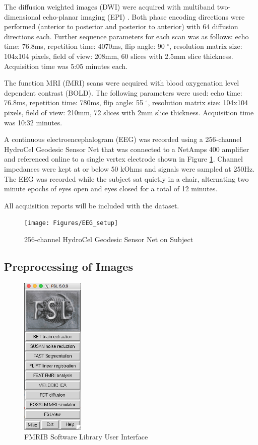 The diffusion weighted images (DWI) were acquired with multiband two-dimensional echo-planar imaging (EPI) \cite{ref:epi}. Both phase encoding directions were performed (anterior to posterior and posterior to anterior) with 64 diffusion directions each. Further sequence parameters for each scan was as follows: echo time: 76.8ms, repetition time: 4070ms, flip angle: 90 $^{\circ}$, resolution matrix size: 104x104 pixels, field of view: 208mm, 60 slices with 2.5mm slice thickness. Acquisition time was 5:05 minutes each. 

The function MRI (fMRI) scans were acquired with blood oxygenation level dependent contrast (BOLD). The following parameters were used:  echo time: 76.8ms, repetition time: 780ms, flip angle: 55 $^{\circ}$, resolution matrix size: 104x104 pixels, field of view: 210mm, 72 slices with 2mm slice thickness. Acquisition time was 10:32 minutes.

A continuous electroencephalogram (EEG) was recorded using a 256-channel HydroCel Geodesic Sensor Net that was connected to a NetAmps 400 amplifier and referenced online to a single vertex electrode shown in Figure \ref{fig:eegsetup}. Channel impedances were kept at or below 50 kOhms and signals were sampled at 250Hz. The EEG was recorded while the subject sat quietly in a chair, alternating two minute epochs of eyes open and eyes closed for a total of 12 minutes. 

All acquisition reports will be included with the dataset. 

\begin{figure}[!th]
    \centering
    \texttt{[image: Figures/EEG\_setup]}
    \caption{256-channel HydroCel Geodesic Sensor Net on Subject}
    \label{fig:eegsetup}
\end{figure}

\subsection{Preprocessing of Images}
\label{sec:preprocess}

\begin{figure}
    \centering
    \vspace{-35pt}
    \includegraphics[width=3cm]{Figures/FSL}
    \caption{FMRIB Software Library User Interface}
    \label{fig:fsl}
\end{figure}

